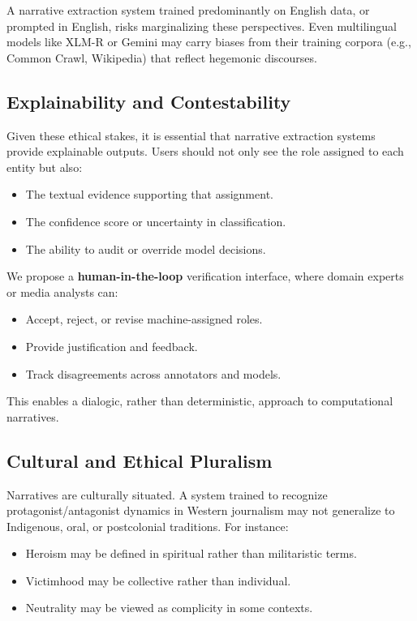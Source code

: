 \documentclass[12pt]{article}
\begin{document}
A narrative extraction system trained predominantly on English data, or prompted in English, risks marginalizing these perspectives. Even multilingual models like XLM-R or Gemini may carry biases from their training corpora (e.g., Common Crawl, Wikipedia) that reflect hegemonic discourses.

\subsection{Explainability and Contestability}

Given these ethical stakes, it is essential that narrative extraction systems provide explainable outputs. Users should not only see the role assigned to each entity but also:
\begin{itemize}
    \item The textual evidence supporting that assignment.
    \item The confidence score or uncertainty in classification.
    \item The ability to audit or override model decisions.
\end{itemize}

We propose a \textbf{human-in-the-loop} verification interface, where domain experts or media analysts can:
\begin{itemize}
    \item Accept, reject, or revise machine-assigned roles.
    \item Provide justification and feedback.
    \item Track disagreements across annotators and models.
\end{itemize}

This enables a dialogic, rather than deterministic, approach to computational narratives.

\subsection{Cultural and Ethical Pluralism}

Narratives are culturally situated. A system trained to recognize protagonist/antagonist dynamics in Western journalism may not generalize to Indigenous, oral, or postcolonial traditions. For instance:
\begin{itemize}
    \item Heroism may be defined in spiritual rather than militaristic terms.
    \item Victimhood may be collective rather than individual.
    \item Neutrality may be viewed as complicity in some contexts.
\end{itemize}
\end{document}
